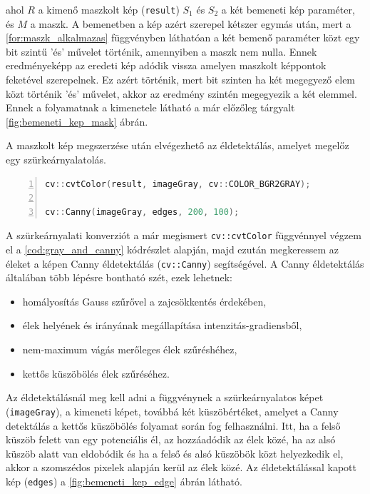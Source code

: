 \par ahol $R$ a kimenő maszkolt kép (\lstinline{result}) $S_1$ és $S_2$ a két bemeneti kép paraméter, és $M$ a maszk. A bemenetben a kép azért szerepel kétszer egymás után, mert a \ref{for:maszk_alkalmazas} függvényben láthatóan a két bemenő paraméter közt egy bit szintű 'és' művelet történik, amennyiben a maszk nem nulla. Ennek eredményeképp az eredeti kép adódik vissza amelyen maszkolt képpontok feketével szerepelnek. Ez azért történik, mert bit szinten ha két megegyező elem közt történik 'és' művelet, akkor az eredmény szintén megegyezik a két elemmel. Ennek a folyamatnak a kimenetele látható a már előzőleg tárgyalt \ref{fig:bemeneti_kep_mask} ábrán.
\par A maszkolt kép megszerzése után elvégezhető az éldetektálás, amelyet megelőz egy szürkeárnyalatolás.

\begin{codewrapper}
\begin{lstlisting}[language=C++, numbers=left, caption={Szürkeárnyalatolás és éldetektálás.}, label={cod:gray_and_canny}]
cv::cvtColor(result, imageGray, cv::COLOR_BGR2GRAY);

cv::Canny(imageGray, edges, 200, 100);
\end{lstlisting}
\end{codewrapper}

\par A szürkeárnyalati konverziót a már megismert \lstinline{cv::cvtColor} függvénnyel \cite{opencv_docs} végzem el a \ref{cod:gray_and_canny} kódrészlet alapján, majd ezután megkeressem az éleket a képen Canny éldetektálás \cite{opencv_docs, canny_edge_detection} (\lstinline{cv::Canny}) segítségével.
\newline A Canny éldetektálás általában több lépésre bontható szét, ezek lehetnek:

\begin{itemize}
    \setlength\itemsep{-2pt}
    \item homályosítás Gauss szűrővel \cite{shapiro2001} a zajcsökkentés érdekében,
    \item élek helyének és irányának megállapítása intenzitás-gradiensből,
    \item nem-maximum vágás merőleges élek szűréshéhez,
    \item kettős küszöbölés élek szűréséhez.
\end{itemize}

\par Az éldetektálásnál meg kell adni a függvénynek a szürkeárnyalatos képet (\lstinline{imageGray}), a kimeneti képet, továbbá két küszöbértéket, amelyet a Canny detektálás a kettős küszöbölés folyamat során fog felhasználni. Itt, ha a felső küszöb felett van egy potenciális él, az hozzáadódik az élek közé, ha az alsó küszöb alatt van eldobódik és ha a felső és alsó küszöbök közt helyezkedik el, akkor a szomszédos pixelek alapján kerül az élek közé. Az éldetektálással kapott kép (\lstinline{edges}) a \ref{fig:bemeneti_kep_edge} ábrán látható.

